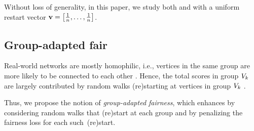 \documentclass[sigconf, anonymous, review]{acmart}
\begin{document}
Without loss of generality, in this paper, we study both \phiPageRank and \resphiPageRank with a uniform restart vector $\mathbf{{v}} = \left[ \frac{1}{n},\ldots, \frac{1}{n} \right]$.

\subsection{Group-adapted fair \pagerank}

Real-world networks are mostly homophilic, 
i.e., vertices in the same group are more likely to be connected to each other 
\citep{mcpherson2001birds,tarbush2012homophily}. 
Hence, the total \pagerank scores in group $V_k$ are largely contributed by random walks 
(re)\-starting at vertices in group $V_k$ \cite{tsioutsiouliklis_fairness-aware_2021}. 

Thus, we propose the notion of \emph{group-adapted fairness}, 
which enhances \pagerank by considering random walks that (re)\-start at each group and 
by penalizing the fairness loss for each such~(re)start.
\end{document}
